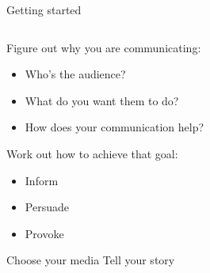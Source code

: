 \begin{frame}{Getting started}

\begin{columns}

    \begin{column}{0.45\textwidth}
        \begin{minipage}[t][.7\textheight]{\textwidth}
        
        Figure out why you are communicating:
        \begin{itemize}
            \item Who's the audience?
            \item What do you want them to do?
            \item How does your communication help?
        \end{itemize}
        \vfill
        Work out how to achieve that goal:
        \begin{itemize}
            \item Inform
            \item Persuade
            \item Provoke
        \end{itemize}
        \vfill
        Choose your media
        \vfill
        Tell your story
        \end{minipage}
    \end{column}

    \begin{column}{0.45\textwidth}

    \end{column}

\end{columns}


\end{frame}

\begin{frame}[plain]

\centering


\end{frame}


